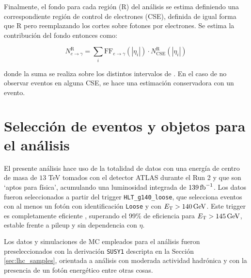 Finalmente, el fondo para cada región (R) del análisis se estima definiendo una correspondiente región de control de electrones (CSE), definida de igual forma que R pero reemplazando los cortes sobre fotones por electrones. Se estima la contribución del fondo entonces como:



\begin{equation}
  N^{\text{R}}_{e\rightarrow\gamma} = \sum_{i} \text{FF}_{e\to\gamma}(|\eta_i|) \cdot N^{\text{R}}_{\mathrm{CSE}} (|\eta_i|)
  \label{eq:efake_cs}
\end{equation}

\noindent
donde la suma se realiza sobre los distintos intervalos de \absEta.
En el caso de no observar eventos en alguna CSE, se hace una estimación conservadora con un evento.



\section{Selección de eventos y objetos para el análisis}\label{sec:selection}

El presente análisis hace uso de la totalidad de datos con una energía de centro de masa de $13$ TeV tomados con el detector ATLAS durante el Run 2 y que son `aptos para física', acumulando una luminosidad integrada de $139\,\text{fb}^{-1}$. Los datos fueron seleccionados a partir del trigger \texttt{HLT\_g140\_loose}, que selecciona eventos con al menos un fotón con identificación \texttt{Loose} y con $E_{\text{T}}>140\,\text{GeV}$. Este trigger es completamente eficiente \cite{TRIG-2018-05}, superando el 99\% de eficiencia para $E_{\text{T}}>145\,\text{GeV}$, estable frente a pileup y sin dependencia con $\eta$.

Los datos y simulaciones de MC empleados para el análisis fueron preseleccionados con la derivación \texttt{SUSY1} descripta en la Sección \ref{sec:lhc_samples}, orientada a análisis con moderada actividad hadrónica y con la presencia de un fotón energético entre otras cosas.

